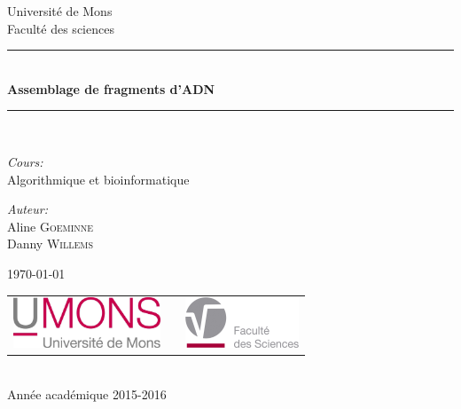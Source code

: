 \documentclass[a4paper, 11pt]{article}
\begin{document}
\begin{titlepage}
\begin{center}

{\Large Université de Mons}\\[1ex]
{\Large Faculté des sciences}\\[2.5cm]

\newcommand{\HRule}{\rule{\linewidth}{0.3mm}}
\HRule \\[0.3cm]
{ \LARGE \bfseries Assemblage de fragments d'ADN \\[0.3cm]}
\HRule \\[1.5cm]

\begin{center}
\emph{Cours:} \\
Algorithmique et bioinformatique
\end{center}

\begin{center}
\emph{Auteur:} \\
Aline \textsc{Goeminne}\\
Danny \textsc{Willems}
\end{center}
\vfill
\today
\vfill

\begin{center}
\begin{tabular}[t]{c c c}
\includegraphics[height=1.5cm]{umons.jpg} &
\hspace{0.3cm} &
\includegraphics[height=1.5cm]{fac.jpg}
\end{tabular}
\end{center}~\\

{\large Année académique 2015-2016}

\end{center}
\end{titlepage}
\end{document}
